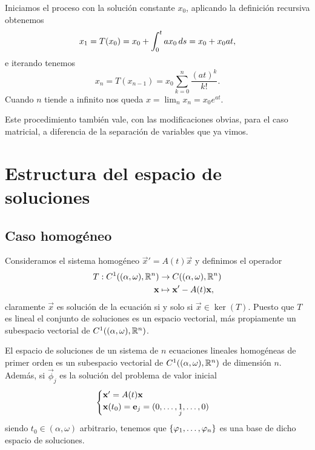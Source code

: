 \documentclass[../ecuaciones_diferenciales.tex]{subfiles}
\begin{document}
\begin{solution}
	Iniciamos el proceso con la solución constante \(x_0\), aplicando la
    definición recursiva obtenemos
	\[x_1 = T(x_0) = x_0 + \int_0^t a x_0 \mathop{d\!} s = x_0 + x_0 a t,\]
	e iterando tenemos
	\[x_n = T(x_{n - 1}) = x_0 \sum_{k = 0}^n \frac{{(at)}^k}{k!}.\]
	Cuando \(n\) tiende a infinito nos queda
	\(x = \lim_n x_n = x_0 e^{at}\).
\end{solution}

Este procedimiento también vale, con las modificaciones obvias, para el caso
matricial, a diferencia de la separación de variables que ya vimos.

\section{Estructura del espacio de soluciones}

\subsection{Caso homogéneo}

Consideramos el sistema homogéneo \(\vec{x}' = A(t) \vec{x}\) y definimos el
operador
\begin{align*}
	T : C^1((\alpha, \omega), \mathbb{R}^n) & \to C((\alpha, \omega), \mathbb{R}^n) \\
							\mathbf{x} & \mapsto \mathbf{x}' - A(t)\mathbf{x},
\end{align*}
claramente \(\vec{x}\) es solución de la ecuación si y solo si
\(\vec{x} \in \ker(T)\).
Puesto que \(T\) es lineal el conjunto de soluciones es un espacio vectorial,
más propiamente un subespacio vectorial de \(C^1((\alpha, \omega), \mathbb{R}^n)\).

\begin{theorem}
	El espacio de soluciones de un sistema de \(n\) ecuaciones lineales
    homogéneas de primer orden es un subespacio vectorial de
    \(C^1((\alpha, \omega), \mathbb{R}^n)\) de dimensión \(n\). Además, si
    \(\vec{\phi}_j\) es la solución del problema de valor inicial
	\[\begin{cases}
		\mathbf{x}' = A(t)\mathbf{x} \\
		\mathbf{x}(t_0) = \mathbf{e}_j = (0, \dots, \underset{j}{1}, \dots, 0)\end{cases}\]
    siendo \(t_0 \in (\alpha, \omega)\) arbitrario, tenemos que
    \(\set{\vec{\phi}_1, \dots, \vec{\phi}_n}\) es una base de dicho espacio de
    soluciones.
\end{theorem}
\end{document}
